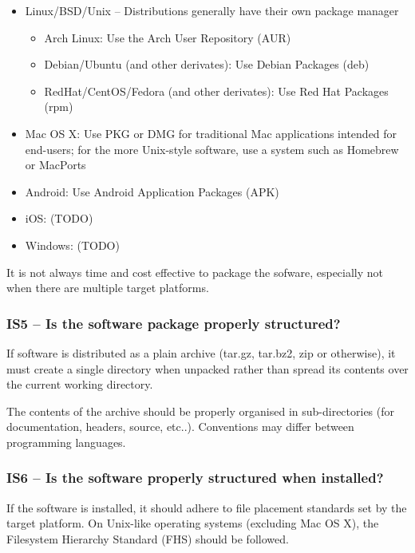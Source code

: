 \documentclass[a4paper,11pt]{article}
\begin{document}
\begin{itemize}
    \item Linux/BSD/Unix -- Distributions generally have their own package manager
    \begin{itemize}
        \item Arch Linux: Use the Arch User Repository (AUR)
        \item Debian/Ubuntu (and other derivates): Use Debian Packages (deb)
        \item RedHat/CentOS/Fedora (and other derivates): Use Red Hat Packages (rpm)
    \end{itemize}
    \item Mac OS X: Use PKG or DMG for traditional Mac applications intended for end-users; for the more Unix-style
        software, use a system such as Homebrew or MacPorts
    \item Android: Use Android Application Packages (APK)
    \item iOS: (TODO) 
    \item Windows: (TODO) 
\end{itemize}

It is not always time and cost effective to package the sofware, especially not
when there are multiple target platforms. 

\subsubsection{IS5 -- Is the software package properly structured?}

If software is distributed as a plain archive (tar.gz, tar.bz2, zip or otherwise),
it must create a single directory when unpacked rather than spread its contents
over the current working directory.

The contents of the archive should be properly organised in sub-directories
(for documentation, headers, source, etc..). Conventions may differ between
programming languages.

\subsubsection{IS6 -- Is the software properly structured when installed?}

If the software is installed, it should adhere to file placement standards set
by the target platform. On Unix-like operating systems (excluding Mac OS X), the Filesystem
Hierarchy Standard (FHS) should be followed.
\end{document}
